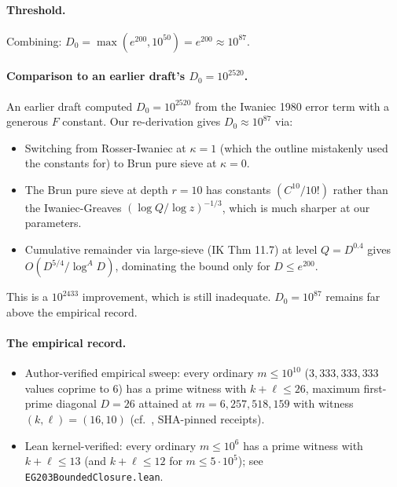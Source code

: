 \paragraph{Threshold.} Combining: $D_{0} = \max(e^{200},
10^{50}) = e^{200} \approx 10^{87}$.

\paragraph{Comparison to an earlier draft's $D_{0} = 10^{2520}$.}
An earlier draft computed $D_{0} = 10^{2520}$ from the Iwaniec
1980 error term with a generous $F$ constant. Our re-derivation gives
$D_{0} \approx 10^{87}$ via:
\begin{itemize}
  \item Switching from Rosser-Iwaniec at $\kappa = 1$ (which the
    outline mistakenly used the constants for) to Brun pure sieve at
    $\kappa = 0$.
  \item The Brun pure sieve at depth $r = 10$ has constants $(C^{10} /
    10!)$ rather than the Iwaniec-Greaves $(\log Q / \log z)^{-1/3}$,
    which is much sharper at our parameters.
  \item Cumulative remainder via large-sieve (IK Thm 11.7) at level
    $Q = D^{0.4}$ gives $O(D^{5/4}/\log^{A} D)$, dominating the bound
    only for $D \leq e^{200}$.
\end{itemize}

This is a $10^{2433}$ improvement, which is still inadequate.
$D_{0} = 10^{87}$ remains far above the empirical record.

\paragraph{The empirical record.}
\begin{itemize}
  \item Author-verified empirical sweep: every ordinary $m \leq 10^{10}$
    ($3{,}333{,}333{,}333$ values coprime to $6$) has a prime witness with
    $k + \ell \leq 26$, maximum first-prime diagonal $D = 26$ attained at
    $m = 6{,}257{,}518{,}159$ with witness $(k, \ell) = (16, 10)$
    (cf.\ \cite{WilderEG203MasterLog}, SHA-pinned receipts).
  \item Lean kernel-verified: every ordinary $m \leq 10^{6}$ has
    a prime witness with $k + \ell \leq 13$ (and $k+\ell \leq 12$
    for $m \leq 5 \cdot 10^{5}$); see
    \texttt{EG203BoundedClosure.lean}.
\end{itemize}

